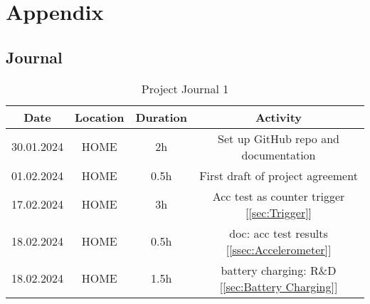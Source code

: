 \chapter{Appendix}
\label{cha:Appendix}

\section{Journal}
\label{sec:Journal}

\begin{table}[H]
    \centering
    
\begin{tabular}{||c | c | c || c||} 
 \hline
 Date &  Location & Duration & Activity \\ [0.5ex] 
 \hline\hline
  30.01.2024 & HOME & 2h & Set up GitHub repo and documentation \\ 
 \hline
   01.02.2024 & HOME & 0.5h & First draft of project agreement \\ 
 \hline
    17.02.2024 & HOME & 3h & Acc test as counter trigger [\ref{sec:Trigger}] \\ 
 \hline
    18.02.2024 & HOME & 0.5h & doc: acc test results [\ref{ssec:Accelerometer}] \\ 
 \hline
     18.02.2024 & HOME & 1.5h & battery charging: R\&D [\ref{sec:Battery Charging}] \\ 
 \hline


\end{tabular}
    \caption{Project Journal 1}
    \label{tab:Project Journal 1}
\end{table}

\newpage